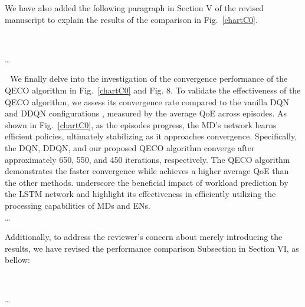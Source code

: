 \documentclass[12pt,draftclsnofoot,onecolumn]{IEEEtran}
\newcommand{\rev}[1]{{\color{blue}#1}} %
\newcommand{\rev}[1]{#1}
\newenvironment{my}[2]%
{\begin{list}{}%
{\setlength{\rightmargin}{#1}\setlength{\leftmargin}{#2}}%


 \item[]{}

} {\end{list}}
\begin{document}
\begin{enumerate}
We have also added the following paragraph in Section V of the revised manuscript to explain the results of the comparison in Fig.~\ref{chartC0}.


		\begin{my}{1cm}{1cm}
	\rev{
		{\ 
			
			\dots 


\,\,\,\,We finally delve into the investigation of the convergence performance of the QECO algorithm in Fig.~\ref{chartC0} and Fig. 8. To validate the effectiveness of the QECO algorithm, we assess its convergence rate compared to the vanilla DQN and DDQN configurations \cite{van2016deep}, measured by the average QoE across episodes. As shown in Fig.~\ref{chartC0}, as the episodes progress, the MD's network learns efficient policies, ultimately stabilizing as it approaches convergence. Specifically, the DQN, DDQN, and our proposed QECO algorithm converge after approximately 650, 550, and 450 iterations, respectively. The QECO algorithm demonstrates the faster convergence while achieves a higher average QoE than the other methods. underscore the beneficial impact of workload prediction by the LSTM network and highlight its effectiveness in efficiently utilizing the processing capabilities of  MDs and ENs. \\\dots }}

\end{my}

\vspace{5mm}

Additionally, to address the reviewer's concern about merely introducing the results, we have revised the performance comparison Subsection in Section VI, as bellow: 


		\begin{my}{1cm}{1cm}
	\rev{ 
		{\ 

\dots \color{black}
			
}}
\end{my}
\end{enumerate}
\end{document}
